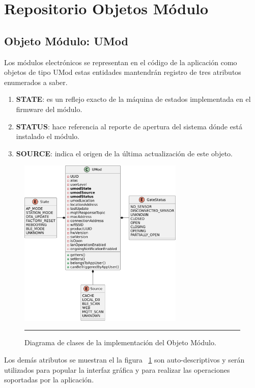 \section{Repositorio Objetos Módulo}
\subsection{Objeto Módulo: UMod}
Los módulos electrónicos se representan en el código de la aplicación como objetos de tipo UMod 
estas entidades mantendrán registro de tres atributos enumerados a saber.
\begin{enumerate}
	\item \textbf{STATE}: es un reflejo exacto de la máquina de estados implementada en el firmware del módulo.
	\item \textbf{STATUS}: hace referencia al reporte de apertura del sistema dónde está instalado el módulo.
	\item \textbf{SOURCE}: indica el origen de la última actualización de este objeto.
\end{enumerate}

\begin{figure}[htbp]
	\centering
	\includegraphics[width=0.7\textwidth]{Figures/iter1/CLASS_umod_ink.png}
	\rule{35em}{1pt}
	\caption[Class Diagram]{Diagrama de clases de la implementación del Objeto Módulo.}
	\label{fig:class_umod}
\end{figure}

Los demás atributos se muestran el la figura ~\ref{fig:class_umod} son auto-descriptivos y serán utilizados para popular la interfaz gráfica y para realizar las operaciones soportadas por la aplicación.

